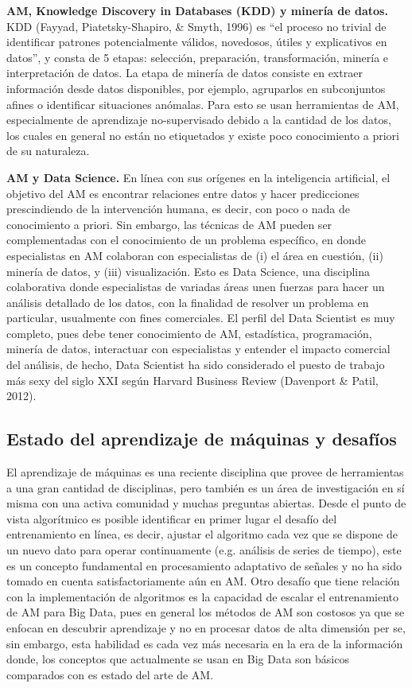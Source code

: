 \textbf{AM, Knowledge Discovery in Databases (KDD) y minería de datos.} KDD (Fayyad, Piatetsky-Shapiro, \& Smyth, 1996) es “el proceso no trivial de identificar patrones potencialmente válidos, novedosos, útiles y explicativos en datos”, y consta de 5 etapas: selección, preparación, transformación, minería e interpretación de datos. La etapa de minería de datos  consiste en extraer información desde datos disponibles, por ejemplo, agruparlos en subconjuntos afines o identificar situaciones anómalas. Para esto se usan herramientas de AM, especialmente de aprendizaje no-supervisado debido a la cantidad de los datos, los cuales en general no están no etiquetados y existe poco conocimiento a priori de su naturaleza. 

\textbf{AM y Data Science.} En línea con sus orígenes en la inteligencia artificial, el objetivo del AM es encontrar relaciones entre datos y hacer predicciones prescindiendo de la intervención humana, es decir, con poco o nada de conocimiento a priori. Sin embargo, las técnicas de AM pueden ser complementadas con el conocimiento de un problema específico, en donde especialistas en AM colaboran con especialistas de (i) el área en cuestión, (ii) minería de datos, y (iii) visualización. Esto es Data Science, una disciplina colaborativa donde especialistas de variadas áreas unen fuerzas para hacer un análisis detallado de los datos, con la finalidad de resolver un problema en particular, usualmente con fines comerciales. El perfil del Data Scientist es muy completo, pues debe tener conocimiento de AM, estadística, programación, minería de datos, interactuar con especialistas y entender el impacto comercial del análisis, de hecho, Data Scientist ha sido considerado el puesto de trabajo más sexy del siglo XXI según Harvard Business Review (Davenport \& Patil, 2012).

\subsection{Estado del aprendizaje de máquinas y desafíos}

El aprendizaje de máquinas es una reciente disciplina que provee de herramientas a una gran cantidad de disciplinas, pero también es un área de investigación en sí misma con una activa comunidad y muchas preguntas abiertas. Desde el punto de vista algorítmico es posible identificar en primer lugar el desafío del entrenamiento en línea, es decir, ajustar el algoritmo cada vez que se dispone de un nuevo dato para operar continuamente (e.g. análisis de series de tiempo), este es un concepto fundamental en procesamiento adaptativo de señales y no ha sido tomado en cuenta satisfactoriamente aún en AM. Otro desafío que tiene relación con la implementación de algoritmos es la capacidad de escalar el entrenamiento de AM para Big Data,  pues en general los métodos de AM son costosos ya que se enfocan en descubrir aprendizaje y no en procesar datos de alta dimensión per se, sin embargo, esta habilidad es cada vez más necesaria en la era de la información donde, los conceptos que actualmente se usan en Big Data son básicos comparados con es estado del arte de AM.

